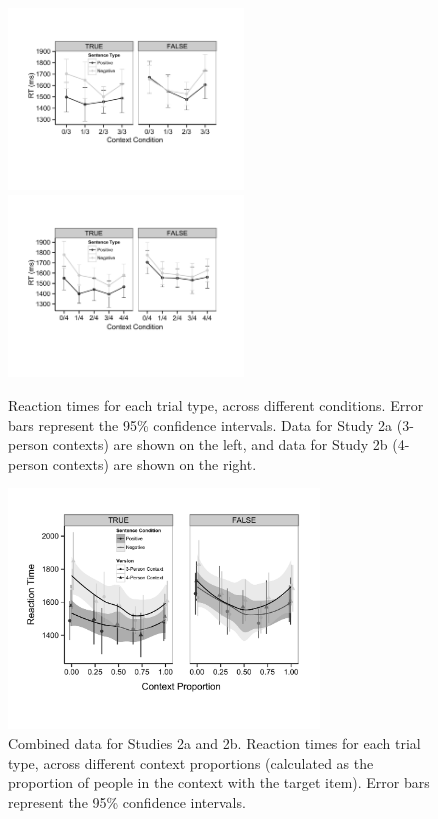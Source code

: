 \documentclass[10pt,letterpaper]{article}
\begin{document}
\begin{figure}
\begin{center} 
\includegraphics[height=1.9in]{figures/study2a_linegraph.pdf}
\includegraphics[height=1.9in]{figures/study2b_linegraph.pdf}
\caption{\label{fig:e2line} Reaction times for each trial type, across different conditions.  Error bars represent the 95\% confidence intervals.  Data for Study 2a (3-person contexts) are shown on the left, and data for Study 2b (4-person contexts) are shown on the right.  }
\end{center} 
\end{figure}

\begin{figure}
\begin{center} 
\includegraphics[width=3.25in]{figures/combined_plot.pdf}
\caption{\label{fig:e2combined} Combined data for Studies 2a and 2b.  Reaction times for each trial type, across different context proportions (calculated as the proportion of people in the context with the target item).  Error bars represent the 95\% confidence intervals.}
\end{center} 
\end{figure}
\end{document}
